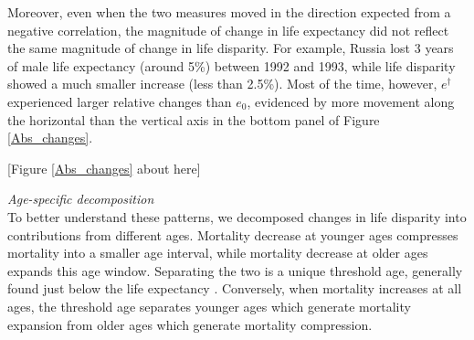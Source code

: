 \documentclass{article}
\begin{document}
\begin{spacing}{1.5}
Moreover, even when the two measures moved in the direction expected from a negative correlation, the magnitude of change in life expectancy did not reflect the same magnitude of change in life disparity. For example, Russia lost 3 years of male life expectancy (around 5\%) between 1992 and 1993, while life disparity showed a much smaller increase (less than 2.5\%). Most of the time, however, $e^\dagger$ experienced larger relative changes than $e_0$, evidenced by more movement along the horizontal than the vertical axis in the bottom panel of Figure \ref{Abs_changes}.


\begin{center}
[Figure \ref{Abs_changes} about here]
\end{center}

\emph{Age-specific decomposition}\\

To better understand these patterns, we decomposed changes in life disparity into contributions from different ages. Mortality decrease at younger ages compresses mortality into a smaller age interval, while mortality decrease at older ages expands this age window. Separating the two is a unique threshold age, generally found just below the life expectancy \citep{zhang2009}. Conversely, when mortality increases at all ages, the threshold age separates younger ages which generate mortality expansion from older ages which generate mortality compression.


\end{spacing}
\end{document}
